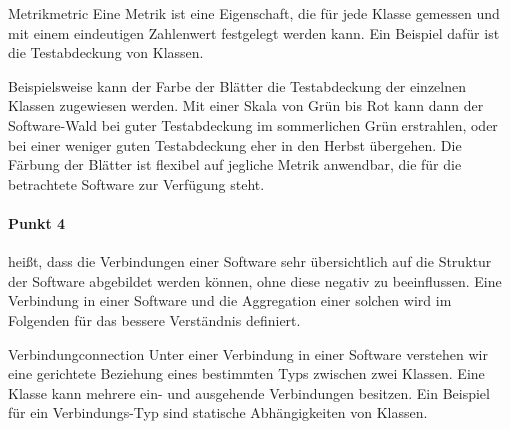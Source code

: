\begin{defbox}{Metrik}{metric}
  Eine Metrik ist eine Eigenschaft, die für jede Klasse gemessen und mit einem eindeutigen Zahlenwert festgelegt werden kann. Ein Beispiel dafür ist die Testabdeckung von Klassen.
\end{defbox}

Beispielsweise kann der Farbe der Blätter die Testabdeckung der einzelnen Klassen zugewiesen werden. Mit einer Skala von Grün bis Rot kann dann der Software-Wald bei guter Testabdeckung im sommerlichen Grün erstrahlen, oder bei einer weniger guten Testabdeckung eher in den Herbst übergehen. Die Färbung der Blätter ist flexibel auf jegliche Metrik anwendbar, die für die betrachtete Software zur Verfügung steht.

\paragraph{Punkt 4} heißt, dass die Verbindungen einer Software sehr übersichtlich auf die Struktur der Software abgebildet werden können, ohne diese negativ zu beeinflussen. Eine Verbindung in einer Software und die Aggregation einer solchen wird im Folgenden für das bessere Verständnis definiert.

\begin{defboxfullwidth}{Verbindung}{connection}
Unter einer Verbindung in einer Software verstehen wir eine gerichtete Beziehung eines bestimmten Typs zwischen zwei Klassen. Eine Klasse kann mehrere ein- und ausgehende Verbindungen besitzen. Ein Beispiel für ein Verbindungs-Typ sind statische Abhängigkeiten von Klassen.
\end{defboxfullwidth}



